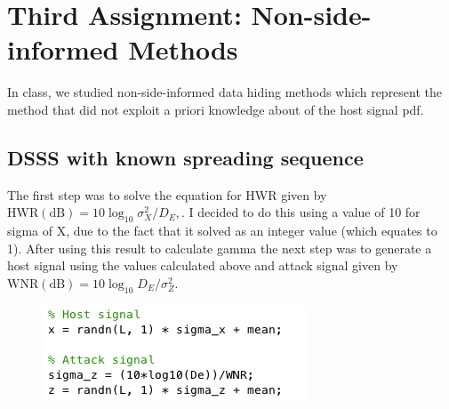 \documentclass[]{assignment}
\begin{document}
\def\studentname{James Dorrian}
\def\ucdstudentnumber{13369451}





\maketitle



\newpage
\section{{\bf Third Assignment:} Non-side-informed Methods}

In class,  we studied non-side-informed data hiding methods which represent the method that did not exploit a priori knowledge about of the host signal pdf.


\subsection{DSSS with known spreading sequence}

The first step was to solve the equation for HWR given by $\mathrm{HWR (dB)}=10\log_{10}{\sigma_X^2}/{D_E},$. I decided to do this using a value of 10 for sigma of X, due to the fact that it solved as an integer value (which equates to 1). After using this result to calculate gamma the next step was to generate a host signal using the values calculated above and attack signal given by $\mathrm{WNR (dB)}=10\log_{10} {D_E}/{\sigma_Z^2}$.

\begin{figure}[h] 
\centering
\includegraphics[scale=0.75]{code_snippet1}
\end{figure}
\end{document}
